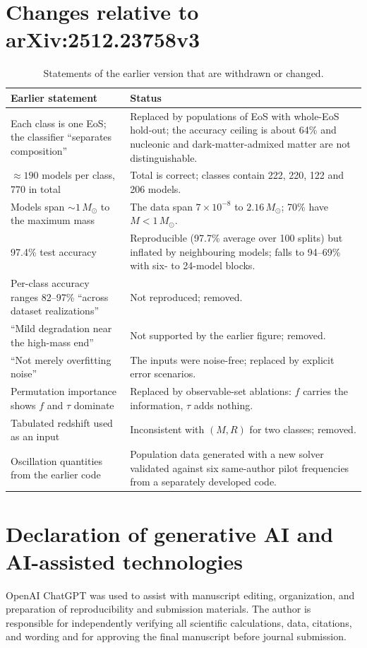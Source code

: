 \documentclass[11pt,a4paper]{article}
\newcommand{\Msun}{M_\odot}
\begin{document}
\section{Changes relative to arXiv:2512.23758v3}\label{sec:changes}
\begin{table}[H]\centering\small\caption{Statements of the earlier version that are withdrawn or changed.}
\begin{tabular}{p{}p{}}\toprule
Earlier statement & Status\\\midrule
Each class is one EoS; the classifier ``separates composition'' & Replaced by populations of EoS with whole-EoS hold-out; the accuracy ceiling is about 64\% and nucleonic and dark-matter-admixed matter are not distinguishable.\\
$\approx190$ models per class, 770 in total & Total is correct; classes contain 222, 220, 122 and 206 models.\\
Models span $\sim1\,\Msun$ to the maximum mass & The data span $7\times10^{-8}$ to $2.16\,\Msun$; 70\% have $M<1\,\Msun$.\\
97.4\% test accuracy & Reproducible (97.7\% average over 100 splits) but inflated by neighbouring models; falls to 94--69\% with six- to 24-model blocks.\\
Per-class accuracy ranges 82--97\% ``across dataset realizations'' & Not reproduced; removed.\\
``Mild degradation near the high-mass end'' & Not supported by the earlier figure; removed.\\
``Not merely overfitting noise'' & The inputs were noise-free; replaced by explicit error scenarios.\\
Permutation importance shows $f$ and $\tau$ dominate & Replaced by observable-set ablations: $f$ carries the information, $\tau$ adds nothing.\\
Tabulated redshift used as an input & Inconsistent with $(M,R)$ for two classes; removed.\\
Oscillation quantities from the earlier code & Population data generated with a new solver validated against six same-author pilot frequencies from a separately developed code.\\\bottomrule\end{tabular}\end{table}

\section*{Declaration of generative AI and AI-assisted technologies}
OpenAI ChatGPT was used to assist with manuscript editing, organization, and preparation of reproducibility and submission materials. The author is responsible for independently verifying all scientific calculations, data, citations, and wording and for approving the final manuscript before journal submission.
\end{document}
